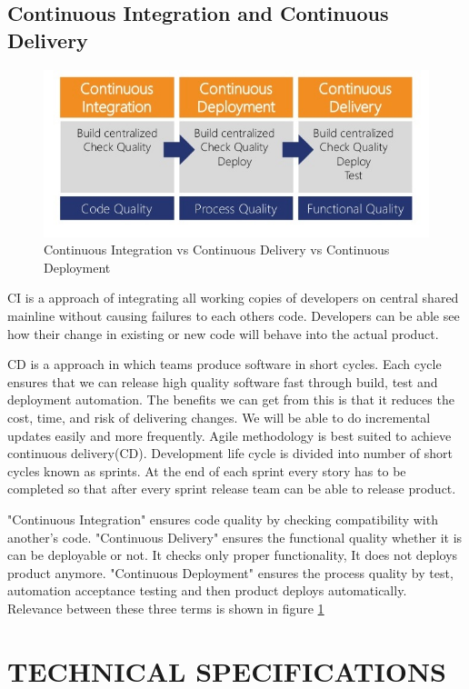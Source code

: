 \documentclass[a4paper,oneside,1,english1pt]{report}
\begin{document}
\section{Continuous Integration and Continuous Delivery}
	\begin{figure}
		\includegraphics[width=.8\linewidth]{diagrams/CICD.jpg}
		\caption{Continuous Integration vs Continuous Delivery vs Continuous Deployment \cite{CI/CD/CD}}
		\label{fig:CI-CD}
	\end{figure}
	\par
	\ac{CI} is a approach of integrating all working copies of developers on central shared mainline without causing failures to each others code. Developers can be able see how their change in existing or new code will behave into the actual product.
	\par
	\ac{CD} is a approach in which teams produce software in short cycles. Each cycle ensures that we can release high quality software fast through build, test and deployment automation.
	The benefits we can get from this is that it reduces the cost, time, and risk of delivering changes. We will be able to do incremental updates easily and more frequently. Agile methodology is best suited to achieve continuous delivery(\ac{CD}). Development life cycle is divided into number of short cycles known as sprints. At the end of each sprint every story has to be completed so that after every sprint release team can be able to release product.
	\par "Continuous Integration" ensures code quality by checking compatibility with another's code. "Continuous Delivery" ensures the functional quality whether it is can be deployable or not. It checks only  proper functionality, It does not deploys product anymore. "Continuous Deployment" ensures the process quality by test, automation acceptance testing and then product deploys automatically.
	Relevance between these three terms is shown in figure \ref{fig:CI-CD}
\chapter{\uppercase{Technical Specifications}}
\end{document}
